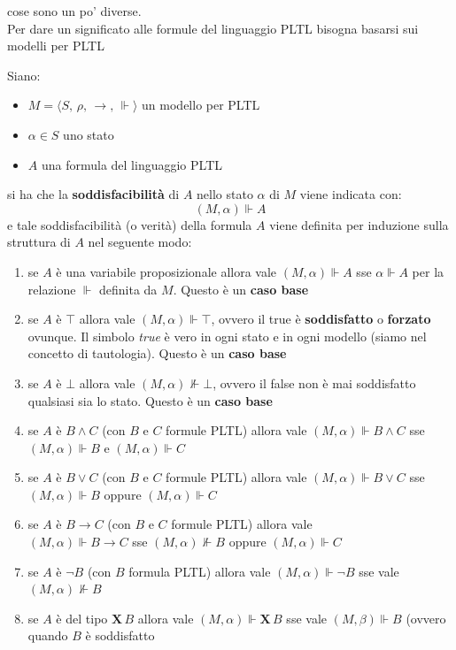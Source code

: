 \documentclass[a4paper,12pt, oneside]{book}
\begin{document}
cose sono un po' diverse.\\
Per dare un significato alle formule del linguaggio PLTL bisogna basarsi sui
modelli per PLTL
\begin{definizione}
  Siano:
  \begin{itemize}
    \item $M=\langle S,\,\rho, \,\to, \,\Vdash\rangle$ un modello per PLTL
    \item $\alpha\in S$ uno stato
    \item $A$ una formula del linguaggio PLTL
  \end{itemize}
  si ha che la \textbf{soddisfacibilità} di $A$ nello stato $\alpha$ di $M$
  viene indicata con:
  \[(M,\alpha)\Vdash A\]
  e tale soddisfacibilità (o verità) della formula $A$ viene definita per
  induzione sulla struttura di $A$ nel seguente modo:
  \begin{enumerate}
    \item se $A$ è una variabile proposizionale allora vale $(M,\alpha)\Vdash A$
    sse $\alpha\Vdash A$ per la relazione $\Vdash$ definita da $M$. Questo è un
    \textbf{caso base}
    \item se $A$ è $\top$ allora vale $(M,\alpha)\Vdash\top$, ovvero il true è
    \textbf{soddisfatto} o \textbf{forzato} ovunque. Il simbolo \emph{true} è
    vero in ogni stato e in ogni modello (siamo nel concetto di tautologia).
    Questo è un \textbf{caso base}
    \item se $A$ è $\bot$ allora vale $(M,\alpha)\nVdash\bot$, ovvero il false
    non è mai soddisfatto qualsiasi sia lo stato. Questo è un \textbf{caso base}
    \item se $A$ è $B\land C$ (con $B$ e $C$ formule PLTL) allora vale
    $(M,\alpha)\Vdash B\land C$ sse $(M,\alpha)\Vdash B$ e $(M,\alpha)\Vdash C$
    \item se $A$ è $B\lor C$ (con $B$ e $C$ formule PLTL) allora vale
    $(M,\alpha)\Vdash B\lor C$ sse $(M,\alpha)\Vdash B$ oppure $(M,\alpha)\Vdash
    C$ 
    \item se $A$ è $B\to C$ (con $B$ e $C$ formule PLTL) allora vale\\
    $(M,\alpha)\Vdash B\to C$ sse $(M,\alpha)\nVdash B$ oppure $(M,\alpha)\Vdash
    C$ 
    \item se $A$ è $\neg B$ (con $B$ formula PLTL) allora vale
    $(M,\alpha)\Vdash\neg B$ sse vale $(M,\alpha)\nVdash B$
    \newpage
    \item se $A$ è del tipo $\mathbf{X}\,B$ allora vale $(M,\alpha)\Vdash
    \mathbf{X}\,B$ sse vale $(M,\beta)\Vdash B$ (ovvero quando $B$ è soddisfatto

\end{enumerate}
\end{definizione}
\end{document}
